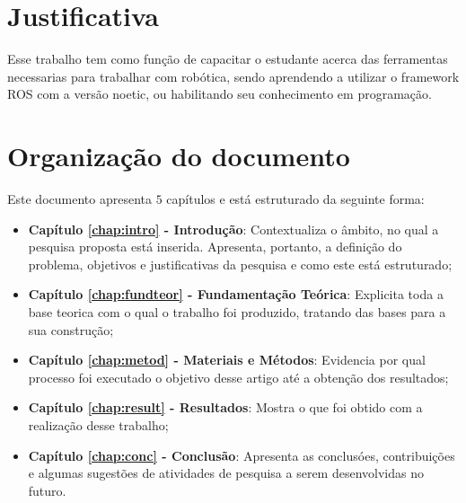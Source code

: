 

\section{Justificativa}
\label{sec:justi}

Esse trabalho tem como função de capacitar o estudante acerca das ferramentas necessarias para trabalhar com robótica, sendo aprendendo a utilizar o framework ROS com a versão noetic, ou habilitando seu conhecimento em programação.

\section{Organização do documento}
\label{section:organizacao}

Este documento apresenta $5$ capítulos e está estruturado da seguinte forma:

\begin{itemize}

  \item \textbf{Capítulo \ref{chap:intro} - Introdução}: Contextualiza o âmbito, no qual a pesquisa proposta está inserida. Apresenta, portanto, a definição do problema, objetivos e justificativas da pesquisa e como este \thetypeworkthree está estruturado;
  \item \textbf{Capítulo \ref{chap:fundteor} - Fundamentação Teórica}: Explicita toda a base teorica com o qual o trabalho foi produzido, tratando das bases para a sua construção;
  \item \textbf{Capítulo \ref{chap:metod} - Materiais e Métodos}: Evidencia por qual processo foi executado o objetivo desse artigo até a obtenção dos resultados;
  \item \textbf{Capítulo \ref{chap:result} - Resultados}: Mostra o que foi obtido com a realização desse trabalho;
  \item \textbf{Capítulo \ref{chap:conc} - Conclusão}: Apresenta as conclusóes, contribuições e algumas sugestões de atividades de pesquisa a serem desenvolvidas no futuro.

\end{itemize}
